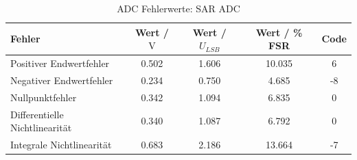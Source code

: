 \begin{table}[htbp]
\centering
\caption{ADC Fehlerwerte: SAR ADC}
\label{tab:sar_adc_errors}
\begin{tabular}{lcccc}
Fehler & Wert / $\si{\volt}$ & Wert / $U_{LSB}$ & Wert / \% FSR & Code \\
\midrule
{\cellcolor[HTML]{FF8438} Positiver Endwertfehler} & 0.502 & 1.606 & 10.035 & 6 \\
{\cellcolor[HTML]{35CCFF} Negativer Endwertfehler} & 0.234 & 0.750 & 4.685 & -8 \\
{\cellcolor[HTML]{8FFF5B} Nullpunktfehler} & 0.342 & 1.094 & 6.835 & 0 \\
{\cellcolor[HTML]{FFEC21} Differentielle Nichtlinearität} & 0.340 & 1.087 & 6.792 & 0 \\
{\cellcolor[HTML]{FF728A} Integrale Nichtlinearität} & 0.683 & 2.186 & 13.664 & -7 \\
\end{tabular}
\end{table}
